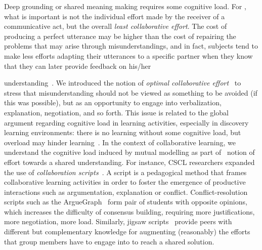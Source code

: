 \documentclass[natbib]{svjour3}
\begin{document}
Deep grounding or shared meaning making requires some cognitive load. For
\citet{clark1986referring}, what is important is not the individual effort made
by the receiver of a communicative act, but the overall \emph{least collaborative
effort}.  The cost of producing a perfect utterance may be higher than the cost
of repairing the problems that may arise through misunderstandings, and in fact,
subjects tend to make less efforts adapting their utterances to a specific
partner when they know that they can later provide feedback on his/her

understanding~\citep{schober1993spatial}. We introduced the notion of
\emph{optimal collaborative effort}~\citep{dillenbourg1995evolution} to stress
that misunderstanding should not be viewed as something to be avoided (if this
was possible), but as an opportunity to engage into verbalization, explanation,
negotiation, and so forth. This issue is related to the global argument
regarding cognitive load in learning activities, especially in discovery
learning environments: there is no learning without some cognitive load, but
overload may hinder learning~\citep{paas2003cognitive}. In the context of
collaborative learning, we understand the cognitive load induced by mutual
modelling as part of~\citet{schwartz1995emergence} notion of effort towards a
shared understanding. For instance, CSCL researchers expanded the use of
\emph{collaboration scripts}~\citep{kobbe2007specifying}. A script is a pedagogical
method that frames collaborative learning activities in order to foster the
emergence of productive interactions such as argumentation, explanation or
conflict. Conflict-resolution scripts such as the {\sc
ArgueGraph}~\citep{dillenbourg2008mechanics} form pair of students with
opposite opinions, which increases the difficulty of consensus building,
requiring more justifications, more negotiation, more load. Similarly, {\sc
jigsaw} scripts~\citep{aronson1978jigsaw} provide peers with different but
complementary knowledge for augmenting (reasonably) the efforts that group members
have to engage into to reach a shared solution. 
\end{document}
